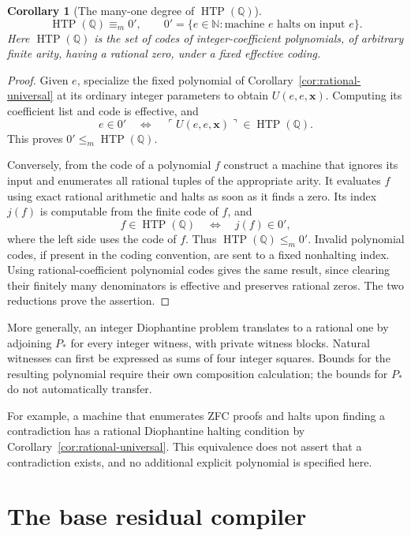 \documentclass[11pt]{article}
\newtheorem{corollary}[theorem]{Corollary}
\theoremstyle{definition}
\theoremstyle{remark}
\newcommand{\Q}{\mathbb Q}
\newcommand{\N}{\mathbb N}
\begin{document}
\begin{corollary}[The many-one degree of $\operatorname{HTP}(\Q)$]
\label{cor:htp-degree}
\[
 \operatorname{HTP}(\Q)\equiv_m 0',
 \qquad 0'=\{e\in\N:\text{machine $e$ halts on input $e$}\}.
\]
Here $\operatorname{HTP}(\Q)$ is the set of codes of integer-coefficient
polynomials, of arbitrary finite arity, having a rational zero, under a
fixed effective coding.
\end{corollary}
\begin{proof}
Given $e$, specialize the fixed polynomial of
Corollary~\ref{cor:rational-universal} at its ordinary integer parameters
to obtain $U(e,e,\mathbf x)$. Computing its coefficient list and code is
effective, and
\[
 e\in0'\quad\Longleftrightarrow\quad
 \ulcorner U(e,e,\mathbf x)\urcorner\in\operatorname{HTP}(\Q).
\]
This proves $0'\le_m\operatorname{HTP}(\Q)$.

Conversely, from the code of a polynomial $f$ construct a machine that
ignores its input and enumerates all rational tuples of the appropriate
arity. It evaluates $f$ using exact rational arithmetic and halts as soon
as it finds a zero. Its index $j(f)$ is computable from the finite code
of $f$, and
\[
 f\in\operatorname{HTP}(\Q)\quad\Longleftrightarrow\quad j(f)\in0',
\]
where the left side uses the code of $f$. Thus
$\operatorname{HTP}(\Q)\le_m0'$. Invalid polynomial codes, if present in
the coding convention, are sent to a fixed nonhalting index. Using
rational-coefficient polynomial codes gives the same result, since
clearing their finitely many denominators is effective and preserves
rational zeros. The two reductions prove the assertion.
\end{proof}

More generally, an integer Diophantine problem translates to a rational
one by adjoining $P_*$ for every integer witness, with private witness
blocks. Natural witnesses can first be expressed as sums of four integer
squares. Bounds for the resulting polynomial require their own composition
calculation; the bounds for $P_*$ do not automatically transfer.

For example, a machine that enumerates ZFC proofs and halts upon finding
a contradiction has a rational Diophantine halting condition by
Corollary~\ref{cor:rational-universal}. This equivalence does not assert
that a contradiction exists, and no additional explicit polynomial is
specified here.

\section{The base residual compiler}
\label{sec:degree8-original}
\end{document}
